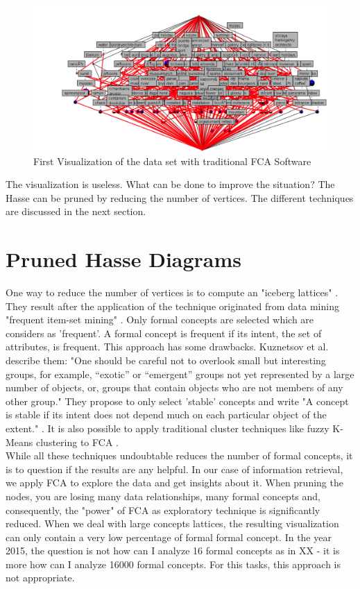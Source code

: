 \documentclass[11pt]{report}
\begin{document}
\begin{figure}[h]
\caption{First Visualization of the data set with traditional FCA Software}
\label{figure:firstVisualizaion}
	\centering
	\includegraphics[width=\linewidth]{./images/firstVisualization}
\end{figure}

The visualization is useless. What can be done to improve the situation? The Hasse can be pruned by reducing the number of vertices. The different techniques are discussed in the next section.

\section{Pruned Hasse Diagrams}

One way to reduce the number of vertices is to compute an "iceberg lattices" \cite{Stumme2002}. They result after the application of the technique originated from data mining "frequent item-set mining" \cite{Agrawal1993}. Only formal concepts are selected which are considers as 'frequent'. A formal concept is frequent if its intent, the set of attributes, is frequent. This approach has some drawbacks. Kuznetsov et al. \cite{Kuznetsov20072} describe them: "One should be careful not to overlook small but interesting groups, for example, “exotic” or “emergent” groups not yet represented by a large number of objects, or, groups that contain objects who are not members of any other group." They propose to only select 'stable' concepts and write "A concept is stable if its intent does not depend much on each particular object of the extent." \cite{Kuznetsov20072}. It is also possible to apply traditional cluster techniques like fuzzy K-Means clustering to FCA \cite{AswaniKumar2010}. \\

	While all these techniques undoubtable reduces the number of formal concepts, it is to question if the results are any helpful. In our case of information retrieval, we apply FCA to explore the data and get insights about it. When pruning the nodes, you are losing many data relationships, many formal concepts and, consequently, the "power" of FCA as exploratory technique is significantly reduced. When we deal with large concepts lattices, the resulting visualization can only contain a very low percentage of formal formal concept. In the year 2015, the question is not how can I analyze 16 formal concepts as in XX - it is more how can I analyze 16000 formal concepts. For this tasks, this approach is not appropriate. \\
	
\end{document}

